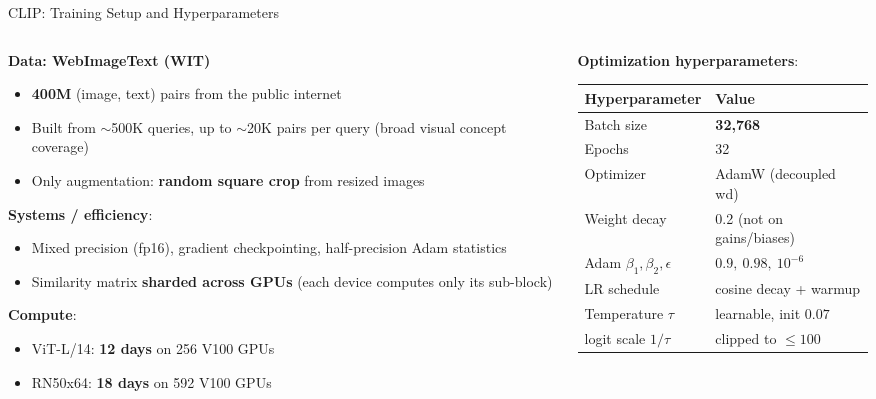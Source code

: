 \begin{frame}{CLIP: Training Setup and Hyperparameters}

  \begin{columns}
    \begin{column}{0.50\textwidth}
      \textbf{Data: WebImageText (WIT)}
      \begin{itemize}
        \item \textbf{400M} (image, text) pairs from the public internet
        \item Built from $\sim$500K queries, up to $\sim$20K pairs per query (broad visual concept coverage)
        \item Only augmentation: \textbf{random square crop} from resized images
      \end{itemize}

      \vspace{0.4em}
      \textbf{Systems / efficiency}:
      \begin{itemize}
        \item Mixed precision (fp16), gradient checkpointing, half-precision Adam statistics
        \item Similarity matrix \textbf{sharded across GPUs} (each device computes only its sub-block)
      \end{itemize}

      \vspace{0.4em}
      \textbf{Compute}:
      \begin{itemize}
        \item ViT-L/14: \textbf{12 days} on 256 V100 GPUs
        \item RN50x64: \textbf{18 days} on 592 V100 GPUs
      \end{itemize}
    \end{column}
    \begin{column}{0.48\textwidth}
      \textbf{Optimization hyperparameters}:
      \vspace{0.2em}
      \begin{center}
      \small
      \begin{tabular}{l l}
        \toprule
        \textbf{Hyperparameter} & \textbf{Value} \\
        \midrule
        Batch size       & \textbf{32{,}768} \\
        Epochs           & 32 \\
        Optimizer        & AdamW (decoupled wd) \\
        Weight decay     & 0.2 (not on gains/biases) \\
        Adam $\beta_1,\beta_2,\epsilon$ & $0.9,\ 0.98,\ 10^{-6}$ \\
        LR schedule      & cosine decay + warmup \\
        Temperature $\tau$ & learnable, init $0.07$ \\
        \quad logit scale $1/\tau$ & clipped to $\leq 100$ \\
        \bottomrule
      \end{tabular}
      \end{center}


\end{column}
\end{columns}
\end{frame}
